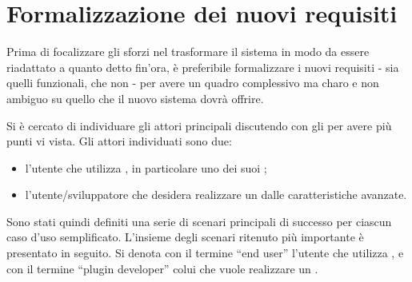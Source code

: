 \section{Formalizzazione dei nuovi requisiti}
Prima di focalizzare gli sforzi nel trasformare il sistema in modo da essere riadattato a quanto detto fin'ora, è preferibile formalizzare i nuovi requisiti - sia quelli funzionali, che non - per avere un quadro complessivo ma charo e non ambiguo su quello che il nuovo sistema dovrà offrire. 

Si è cercato di individuare gli attori principali discutendo con gli \stakeholders{} per avere più punti vi vista. Gli attori individuati sono due:
\begin{itemize}
\item l'utente che utilizza \visualnetkit{}, in particolare uno dei suoi \plugin{};
\item l'utente/sviluppatore che desidera realizzare un \plugin{} dalle caratteristiche avanzate.
\end{itemize}
Sono stati quindi definiti una serie di scenari principali di successo per ciascun caso d'uso semplificato. L'insieme degli scenari ritenuto più importante è presentato in seguito. Si denota con il termine ``end user'' l'utente che utilizza \visualnetkit{}, e con il termine ``plugin developer'' colui che vuole realizzare un \plugin{}.

